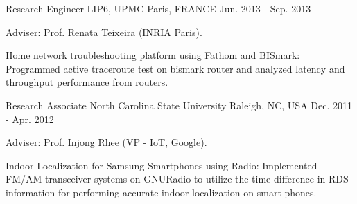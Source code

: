 \begin{cventries}
  \cventry
    {Research Engineer} %
    {LIP6, UPMC} %
    {Paris, FRANCE} %
    {Jun. 2013 - Sep. 2013} %
    {
      \begin{cvitems} %
      \item {Adviser: Prof. Renata Teixeira (INRIA Paris).}
%      
      \item {Home network troubleshooting platform using Fathom and BISmark: Programmed active traceroute test on bismark router and analyzed latency and throughput performance from routers.}
%      
      \end{cvitems}
    }
    
  \cventry
    {Research Associate} %
    {North Carolina State University} %
    {Raleigh, NC, USA} %
    {Dec. 2011 - Apr. 2012} %
    {
      \begin{cvitems} %
      \item {Adviser: Prof. Injong Rhee (VP - IoT, Google).}
%      
      \item {Indoor Localization for Samsung Smartphones using Radio: Implemented FM/AM transceiver systems on GNURadio to utilize the time difference in RDS information for performing accurate indoor localization on smart phones.}
%      
      \end{cvitems}
    }
    

\end{cventries}
